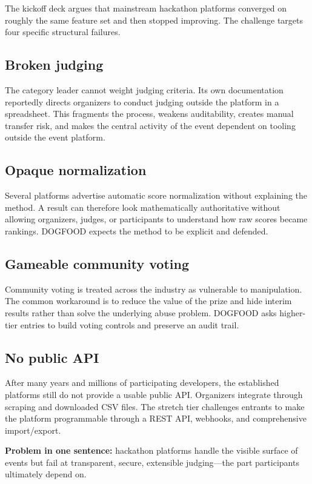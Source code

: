 \documentclass[11pt]{article}
\begin{document}
The kickoff deck argues that mainstream hackathon platforms converged on roughly the same feature set and then stopped improving. The challenge targets four specific structural failures.

\subsection{Broken judging}

The category leader cannot weight judging criteria. Its own documentation reportedly directs organizers to conduct judging outside the platform in a spreadsheet. This fragments the process, weakens auditability, creates manual transfer risk, and makes the central activity of the event dependent on tooling outside the event platform.

\subsection{Opaque normalization}

Several platforms advertise automatic score normalization without explaining the method. A result can therefore look mathematically authoritative without allowing organizers, judges, or participants to understand how raw scores became rankings. DOGFOOD expects the method to be explicit and defended.

\subsection{Gameable community voting}

Community voting is treated across the industry as vulnerable to manipulation. The common workaround is to reduce the value of the prize and hide interim results rather than solve the underlying abuse problem. DOGFOOD asks higher-tier entries to build voting controls and preserve an audit trail.

\subsection{No public API}

After many years and millions of participating developers, the established platforms still do not provide a usable public API\@. Organizers integrate through scraping and downloaded CSV files. The stretch tier challenges entrants to make the platform programmable through a REST API, webhooks, and comprehensive import/export.

\begin{infobox}
\textbf{Problem in one sentence:} hackathon platforms handle the visible surface of events but fail at transparent, secure, extensible judging---the part participants ultimately depend on.
\end{infobox}
\end{document}
